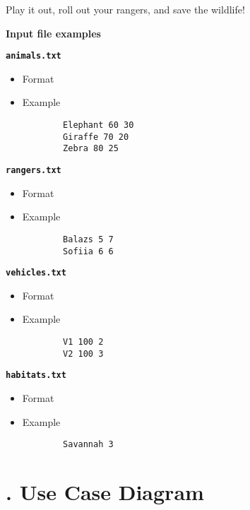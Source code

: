 \documentclass[a4paper,12pt]{article}
\begin{document}
Play it out, roll out your rangers, and save the wildlife!

\bigskip

\textbf{Input file examples}

\textbf{\texttt{animals.txt}}
\begin{itemize}
    \item Format
    \newline {}
    \item Example
    \begin{verbatim}
        Elephant 60 30
        Giraffe 70 20
        Zebra 80 25
    \end{verbatim}
\end{itemize}

\textbf{\texttt{rangers.txt}}
\begin{itemize}
    \item Format
    \newline {}
    \item Example
    \begin{verbatim}
        Balazs 5 7
        Sofiia 6 6
    \end{verbatim}
\end{itemize}

\textbf{\texttt{vehicles.txt}}
\begin{itemize}
    \item Format
    \newline {}
    \item Example
    \begin{verbatim}
        V1 100 2
        V2 100 3
    \end{verbatim}
\end{itemize}

\textbf{\texttt{habitats.txt}}
\begin{itemize}
    \item Format
    \newline {}
    \item Example
    \begin{verbatim}
        Savannah 3
    \end{verbatim}
\end{itemize}

\newpage
\section*{. Use Case Diagram}
\end{document}
